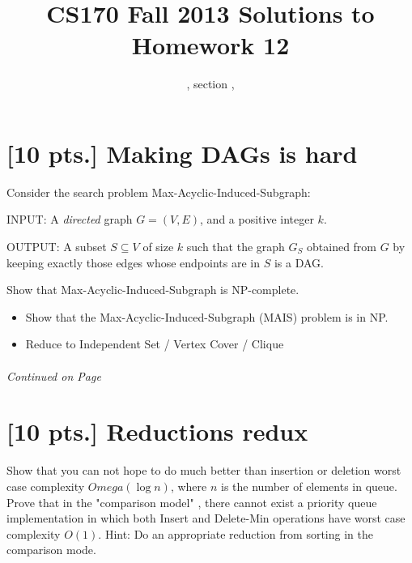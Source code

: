 \documentclass[11pt]{article}
\title{CS170  Fall 2013 Solutions to Homework 12}
\author{\Name, section \Sec, \texttt{\Login}}
\begin{document}
\maketitle

\section{[10 pts.] Making DAGs is hard}

Consider the search problem Max-Acyclic-Induced-Subgraph: 

INPUT: A \emph{directed} graph $G=(V,E)$, and a positive integer $k$.

OUTPUT: A subset $S\subseteq V$ of size $k$ such that the graph $G_S$ obtained
from $G$ by keeping exactly those edges whose endpoints are in $S$ is a 
DAG.

Show that Max-Acyclic-Induced-Subgraph is NP-complete.

\begin{itemize}

\item Show that the Max-Acyclic-Induced-Subgraph (MAIS) problem is in NP.

\item Reduce to Independent Set / Vertex Cover / Clique

\end{itemize}

\label{pg:end-of-p1}
%
\paragraph{} \emph{Continued on Page \pageref{pg:p1-continuation}}

\newpage

\pagestyle{plain}

\section{[10 pts.] Reductions redux}

Show that you can not hope to do much better than insertion 
or deletion worst case complexity $Omega(\log n)$, where $n$ is the 
number of elements in queue. Prove that in the "comparison model"
, there cannot exist a priority queue implementation in which
both Insert and Delete-Min operations have worst case complexity $O(1)$. 
Hint: Do an appropriate reduction from sorting in the comparison mode. 
 
\end{document}

